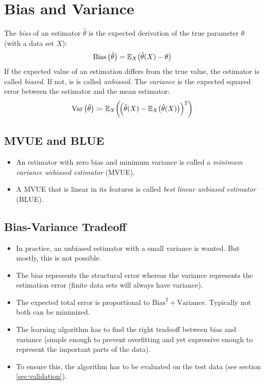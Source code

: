 	\section{Bias and Variance}
		The \emph{bias} of an estimator \(\hat{\theta}\) is the expected derivation of the true parameter \(\theta\) (with a data set \(X\)):
		\begin{equation}
			\operatorname{Bias}\big(\hat{\theta}\big) = \mathbb{E}_X\big(\hat{\theta}(X) - \theta\big)
		\end{equation}
		If the expected value of an estimation differs from the true value, the estimator is called \emph{biased}. If not, is is called \emph{unbiased}. The \emph{variance} is the expected squared error between the estimator and the mean estimator:
		\begin{equation}
			\operatorname{Var}\big(\hat{\theta}\big) \coloneqq \mathbb{E}_X\bigg( \! \Big( \hat{\theta}(X) - \mathbb{E}_X\big(\hat{\theta}(X)\big) \Big)^2 \bigg)
		\end{equation}

		\subsection{MVUE and BLUE}
			\begin{itemize}
				\item An estimator with zero bias and minimum variance is called a \emph{minimum variance unbiased estimator} (MVUE).
				\item A MVUE that is linear in its features is called \emph{best linear unbiased estimator} (BLUE).
			\end{itemize}

		\subsection{Bias-Variance Tradeoff}
			\begin{itemize}
				\item In practice, an unbiased estimator with a small variance is wanted. But mostly, this is not possible.
				\item The bias represents the structural error whereas the variance represents the estimation error (finite data sets will always have variance).
				\item The expected total error is proportional to \( \textrm{Bias}^2 + \textrm{Variance} \). Typically not both can be minimized.
				\item The learning algorithm has to find the right tradeoff between bias and variance (simple enough to prevent overfitting and yet expressive enough to represent the important parts of the data).
				\item To ensure this, the algorithm has to be evaluated on the test data (see section \ref{sec:validation}).
			\end{itemize}

